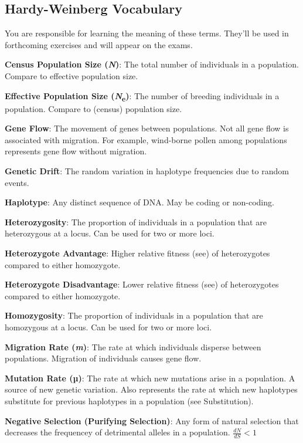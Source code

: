 \documentclass[11pt]{article}
\begin{document}
\thispagestyle{empty}
\subsection*{Hardy-Weinberg Vocabulary}

You are responsible for learning the meaning of these terms. They'll be used in forthcoming exercises and will appear on the exams.\medskip

\textbf{Census Population Size (\emph{N})}: The total number of
individuals in a population. Compare to effective population size.\medskip

\textbf{Effective Population Size (\emph{N}\textsubscript{e})}: The
number of breeding individuals in a population. Compare to (census)
population size.\medskip

\textbf{Gene Flow}: The movement of genes between populations. Not all
gene flow is associated with migration. For example, wind-borne pollen
among populations represents gene flow without migration.\medskip

\textbf{Genetic Drift}: The random variation in haplotype frequencies
due to random events.\medskip

\textbf{Haplotype}: Any distinct sequence of DNA. May be coding or
non-coding.\medskip

\textbf{Heterozygosity}: The proportion of individuals in a population
that are heterozygous at a locus. Can be used for two or more loci.\medskip

\textbf{Heterozygote Advantage}: Higher relative fitness (see) of
heterozygotes compared to either homozygote.\medskip

\textbf{Heterozygote Disadvantage}: Lower relative fitness (see) of
heterozygotes compared to either homozygote.\medskip

\textbf{Homozygosity}: The proportion of individuals in a population
that are homozygous at a locus. Can be used for two or more loci.\medskip

\textbf{Migration Rate (\emph{m})}: The rate at which individuals
disperse between populations. Migration of individuals causes gene flow.\medskip

\textbf{Mutation Rate (µ)}: The rate at which new mutations arise in a
population. A source of new genetic variation. Also represents the rate
at which new haplotypes substitute for previous haplotypes in a
population (see Substitution).\medskip

\textbf{Negative Selection (Purifying Selection)}: Any form of natural
selection that decreases the frequencey of detrimental alleles in a
population. $\frac{dN}{dS} < 1$\medskip
\end{document}
